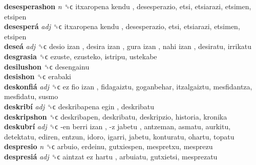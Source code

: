 \textbf{desesperashon} \emph{n}  ␝ϲ   itxaropena kendu , desesperazio, etsi, etsiarazi, etsimen, etsipen  \\
\textbf{desesperá} \emph{adj}  ␝ϲ   itxaropena kendu , desesperazio, etsi, etsiarazi, etsimen, etsipen  \\
\textbf{deseá} \emph{adj}  ␝ϲ   desio izan ,  desira izan ,  gura izan ,  nahi izan , desiratu, irrikatu  \\
\textbf{desgrasia} ␝ϲ  ezuste, ezusteko, istripu, ustekabe  \\
\textbf{desilushon} ␝ϲ  desengainu  \\
\textbf{desishon} ␝ϲ  erabaki  \\
\textbf{deskonfiá} \emph{adj}  ␝ϲ   ez fio izan , fidagaiztu, goganbehar, itzalgaiztu, mesfidantza, mesfidatu, susmo  \\
\textbf{deskribí} \emph{adj}  ␝ϲ   deskribapena egin , deskribatu  \\
\textbf{deskripshon} ␝ϲ  deskribapen, deskribatu, deskripzio, historia, kronika  \\
\textbf{deskubrí} \emph{adj}  ␝ϲ   -en berri izan ,  -z jabetu , antzeman, asmatu, aurkitu, detektatu, ediren, entzun, idoro, igarri, jabetu, konturatu, ohartu, topatu  \\
\textbf{despresio} \emph{n}  ␝ϲ  arbuio, erdeinu, gutxiespen, mespretxu, mesprezu  \\
\textbf{despresiá} \emph{adj}  ␝ϲ   aintzat ez hartu , arbuiatu, gutxietsi, mesprezatu  \\
